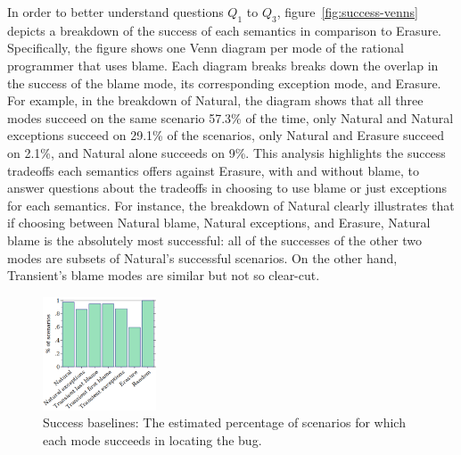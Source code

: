 In order to better understand questions $Q_1$ to $Q_3$, figure~\ref{fig:success-venns} depicts a breakdown of the success of each semantics in comparison to Erasure.
Specifically, the figure shows one Venn diagram per mode of the rational programmer that uses blame.
Each diagram breaks breaks down the overlap in the success of the blame mode, its corresponding exception mode, and Erasure.
For example, in the breakdown of Natural, the diagram shows that all three modes succeed on the same scenario 57.3\% of the time, only Natural and Natural exceptions succeed on 29.1\% of the scenarios, only Natural and Erasure succeed on 2.1\%, and Natural alone succeeds on 9\%.
This analysis highlights the success tradeoffs each semantics offers against Erasure, with and without blame, to answer questions about the tradeoffs in choosing to use blame or just exceptions for each semantics.
For instance, the breakdown of Natural clearly illustrates that if choosing between Natural blame, Natural exceptions, and Erasure, Natural blame is the absolutely most successful: all of the successes of the other two modes are subsets of Natural's successful scenarios.
On the other hand, Transient's blame modes are similar but not so clear-cut.

\begin{figure}
  \centering
  \includegraphics[width=0.30\textwidth]{./plots/success-bars}
  \caption{Success baselines: The estimated percentage of scenarios for which each mode succeeds in locating the bug.
  }
  \label{fig:success-bars}
\end{figure}

